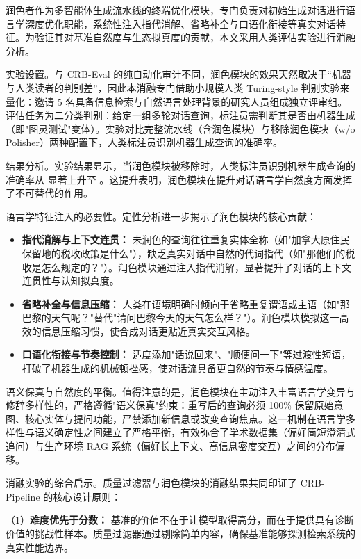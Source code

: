 润色者作为多智能体生成流水线的终端优化模块，专门负责对初始生成对话进行语言学深度优化职能，系统性注入指代消解、省略补全与口语化衔接等真实对话特征。为验证其对基准自然度与生态拟真度的贡献，本文采用人类评估实验进行消融分析。

实验设置。与 CRB-Eval 的纯自动化审计不同，润色模块的效果天然取决于“机器与人类读者的判别差”，因此本消融专门借助小规模人类 Turing-style 判别实验来量化：邀请 5 名具备信息检索与自然语言处理背景的研究人员组成独立评审组。评估任务为二分类判别：给定一组多轮对话查询，标注员需判断其是否由机器生成（即"图灵测试"变体）。实验对比完整流水线（含润色模块）与移除润色模块（w/o Polisher）两种配置下，人类标注员识别机器生成查询的准确率。

结果分析。实验结果显示，当润色模块被移除时，人类标注员识别机器生成查询的准确率从  显著上升至 。这提升表明，润色模块在提升对话语言学自然度方面发挥了不可替代的作用。

语言学特征注入的必要性。定性分析进一步揭示了润色模块的核心贡献：
\begin{itemize}
    \item \textbf{指代消解与上下文连贯：} 未润色的查询往往重复实体全称（如"加拿大原住民保留地的税收政策是什么"），缺乏真实对话中自然的代词指代（如"那他们的税收是怎么规定的？"）。润色模块通过注入指代消解，显著提升了对话的上下文连贯性与认知拟真度。
    \item \textbf{省略补全与信息压缩：} 人类在语境明确时倾向于省略重复谓语或主语（如"那巴黎的天气呢？"替代"请问巴黎今天的天气怎么样？"）。润色模块模拟这一高效的信息压缩习惯，使合成对话更贴近真实交互风格。
    \item \textbf{口语化衔接与节奏控制：} 适度添加"话说回来"、"顺便问一下"等过渡性短语，打破了机器生成的机械顿挫感，使对话流具备更自然的节奏与情感温度。
\end{itemize}

语义保真与自然度的平衡。值得注意的是，润色模块在主动注入丰富语言学变异与修辞多样性的，严格遵循"语义保真"约束：重写后的查询必须 100\% 保留原始意图、核心实体与提问功能，严禁添加新信息或改变查询焦点。这一机制在语言学多样性与语义确定性之间建立了严格平衡，有效弥合了学术数据集（偏好简短澄清式追问）与生产环境 RAG 系统（偏好长上下文、高信息密度交互）之间的分布偏移。

消融实验的综合启示。质量过滤器与润色模块的消融结果共同印证了 CRB-Pipeline 的核心设计原则：

（1）\textbf{难度优先于分数：} 基准的价值不在于让模型取得高分，而在于提供具有诊断价值的挑战性样本。质量过滤器通过剔除简单内容，确保基准能够探测检索系统的真实性能边界。

